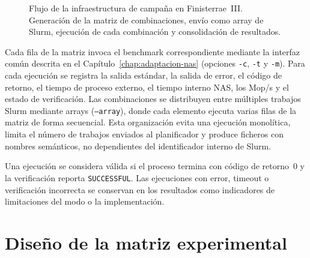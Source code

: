 \begin{figure}[htbp]
\centering
{}
\caption{Flujo de la infraestructura de campaña en Finisterrae~III. Generación
de la matriz de combinaciones, envío como array de Slurm, ejecución de cada
combinación y consolidación de resultados.}
\label{fig:metodologia-campana}
\end{figure}

Cada fila de la matriz invoca el benchmark correspondiente mediante la
interfaz común descrita en el Capítulo~\ref{chap:adaptacion-nas}
(opciones \texttt{-c}, \texttt{-t} y \texttt{-m}).
Para cada ejecución se registra la salida estándar, la salida de error, el
código de retorno, el tiempo de proceso externo, el tiempo interno NAS, los
Mop/s y el estado de verificación. Las combinaciones se distribuyen entre
múltiples trabajos Slurm mediante arrays (\texttt{--array}), donde cada elemento
ejecuta varias filas de la matriz de forma secuencial. Esta organización
evita una ejecución monolítica, limita el número de trabajos enviados al
planificador y produce ficheros con nombres semánticos, no dependientes del
identificador interno de Slurm.

Una ejecución se considera válida si el proceso termina con código de retorno~0
y la verificación reporta \texttt{SUCCESSFUL}. Las ejecuciones con error, timeout
o verificación incorrecta se conservan en los resultados como indicadores de
limitaciones del modo o la implementación.


\section{Diseño de la matriz experimental}
\label{sec:matriz-experimental}

